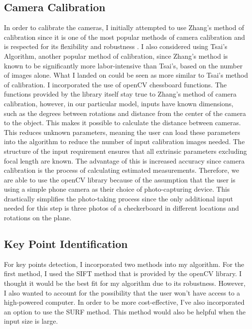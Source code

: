 \documentclass[10pt,twocolumn]{article}
\begin{document}
\subsection{Camera Calibration}
In order to calibrate the cameras, I initially attempted to use Zhang's method of calibration since it is one of the most popular methods of camera calibration and is respected for its flexibility and robustness \cite{feng2008comparison}. I also considered using Tsai's Algorithm, another popular method of calibration, since Zhang's method is known to be significantly more labor-intensive than Tsai's, based on the number of images alone. \cite{li2014practical} What I landed on could be seen as more similar to Tsai's method of calibration.
I incorporated the use of openCV chessboard functions. The functions provided by the library itself stay true to Zhang's method of camera calibration, however, in our particular model, inputs have known dimensions, such as the degrees between rotations and distance from the center of the camera to the object. This makes it possible to calculate the distance between cameras. This reduces unknown parameters, meaning the user can load these parameters into the algorithm to reduce the number of input calibration images needed. The structure of the input requirement ensures that all extrinsic parameters excluding focal length are known. The advantage of this is increased accuracy since camera calibration is the process of calculating estimated measurements. Therefore, we are able to use the openCV library because of the assumption that the user is using a simple phone camera as their choice of photo-capturing device. This drastically simplifies the photo-taking process since the only additional input needed for this step is three photos of a checkerboard in different locations and rotations on the plane.

\subsection{Key Point Identification}
For key points detection, I incorporated two methods into my algorithm. For the first method, I used the SIFT method that is provided by the openCV library. I thought it would be the best fit for my algorithm due to its robustness. However, I also wanted to account for the possibility that the user won't have access to a high-powered computer. In order to be more cost-effective, I've also incorporated an option to use the SURF method. This method would also be helpful when the input size is large.
\end{document}
